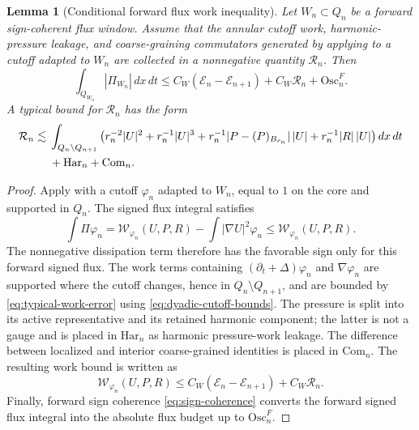 \documentclass[11pt]{article}
\numberwithin{equation}{section}
\theoremstyle{plain}
\newtheorem{lemma}[theorem]{Lemma}
\theoremstyle{definition}
\theoremstyle{remark}
\newcommand{\Har}{\mathrm{Har}}
\newcommand{\Com}{\mathrm{Com}}
\newcommand{\calE}{\mathcal E}
\newcommand{\calR}{\mathcal R}
\newcommand{\calW}{\mathcal W}
\begin{document}
\begin{lemma}[Conditional forward flux work inequality]
\label{lem:flux-work-ep-envelope}
Let \(W_n\subset Q_n\) be a forward sign-coherent flux window.  Assume that the
annular cutoff work, harmonic-pressure leakage, and coarse-graining commutators
generated by applying  to a cutoff adapted to
\(W_n\) are collected in a nonnegative quantity \(\calR_n\).  Then
\begin{equation}
        \int_{Q_{W_n}}|\Pi_{W_n}|\,dx\,dt
        \le
        C_W(\calE_n-\calE_{n+1})+C_W\calR_n+\mathrm{Osc}^F_n.
        \label{eq:flux-work-envelope}
\end{equation}
A typical bound for \(\calR_n\) has the form
\begin{align}
        \calR_n
        \lesssim{}&
        \int_{Q_n\setminus Q_{n+1}}
        \left(
            r_n^{-2}|U|^2
            +
            r_n^{-1}|U|^3
            +
            r_n^{-1}|P-(P)_{B_{r_n}}|\,|U|
            +
            r_n^{-1}|R|\,|U|
        \right)dx\,dt
        \notag\\
        &+
        \Har_n+\Com_n.
        \label{eq:typical-work-error}
\end{align}
\end{lemma}

\begin{proof}
Apply  with a cutoff \(\varphi_n\) adapted
to \(W_n\), equal to \(1\) on the core and supported in \(Q_n\).  The signed
flux integral satisfies
\[
        \int \Pi\varphi_n
        =
        \calW_{\varphi_n}(U,P,R)
        -
        \int |\nabla U|^2\varphi_n
        \le
        \calW_{\varphi_n}(U,P,R).
\]
The nonnegative dissipation term therefore has the favorable sign only for this
forward signed flux.  The work terms containing \((\partial_t+\Delta)\varphi_n\)
and \(\nabla\varphi_n\) are supported where the cutoff changes, hence in
\(Q_n\setminus Q_{n+1}\), and are bounded by
\eqref{eq:typical-work-error} using \eqref{eq:dyadic-cutoff-bounds}.  The pressure is split into its active representative and its retained harmonic component; the latter is not a gauge and is placed in \(\Har_n\) as harmonic pressure-work leakage.  The difference between localized and
interior coarse-grained identities is placed in \(\Com_n\).  The resulting work
bound is written as
\[
        \calW_{\varphi_n}(U,P,R)
        \le
        C_W(\calE_n-\calE_{n+1})+C_W\calR_n.
\]
Finally, forward sign coherence \eqref{eq:sign-coherence} converts the forward
signed flux integral into the absolute flux budget up to \(\mathrm{Osc}^F_n\).
\end{proof}
\end{document}
